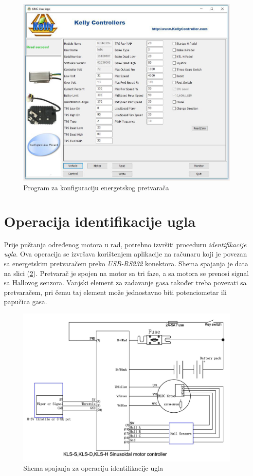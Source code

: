 \begin{figure}
\centering
\includegraphics[width=\textwidth]{slike/configuration.jpg}
\caption{Program za konfiguraciju energetskog pretvarača}
\label{fig:configuration}
\end{figure}

\section{Operacija identifikacije ugla}

\qquad Prije puštanja određenog motora u rad, potrebno izvršiti proceduru \textit{identifikacije ugla}. Ova operacija se izvršava korištenjem aplikacije na računaru koji je povezan sa energetskim pretvaračem preko \textit{USB-RS232} konektora. Shema spajanja je data na slici (\ref{fig:angleident}). Pretvarač je spojen na motor sa tri faze, a sa motora se prenosi signal sa Hallovog senzora. Vanjski element za zadavanje gasa također treba povezati sa pretvaračem, pri čemu taj element može jednostavno biti potenciometar ili papučica gasa.

\begin{figure}
\centering
\includegraphics[width=\textwidth]{slike/angleident.jpg}
\caption{Shema spajanja za operaciju identifikacije ugla}
\label{fig:angleident}
\end{figure}

